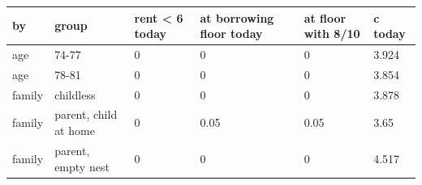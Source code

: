 \begingroup\small
\setlength{\tabcolsep}{3pt}
\renewcommand{\arraystretch}{1.04}
\begin{tabularx}{\linewidth}{XXXXXX}
\toprule
by & group & rent \textless{} 6 today & at borrowing floor today & at floor with 8/10 & c today \\
\midrule
age & 74-77 & 0 & 0 & 0 & 3.924 \\
age & 78-81 & 0 & 0 & 0 & 3.854 \\
family & childless & 0 & 0 & 0 & 3.878 \\
family & parent, child at home & 0 & 0.05 & 0.05 & 3.65 \\
family & parent, empty nest & 0 & 0 & 0 & 4.517 \\
\bottomrule
\end{tabularx}
\endgroup
